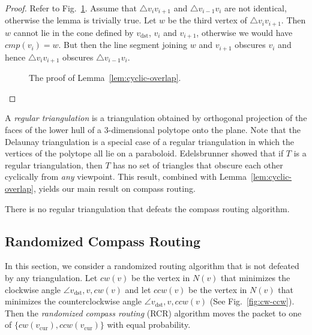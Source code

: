 \documentclass[final]{siamltex}
\newcommand{\centeripe}[1]{\begin{center}\Ipe{#1}\end{center}}
\newcommand{\seclabel}[1]{\label{sec:#1}}
\newcommand{\figlabel}[1]{\label{fig:#1}}
\newcommand{\figref}[1]{\mbox{Fig.~\ref{fig:#1}}}
\newcommand{\thmlabel}[1]{\label{thm:#1}}
\newcommand{\lemref}[1]{Lemma~\ref{lem:#1}}
\newcommand{\vdest}{v_\mathrm{dst}}
\newcommand{\vcur}{v_\mathrm{cur}}
\newcommand{\compass}[1]{\mathit{cmp}(#1)}
\newcommand{\cwcompass}[1]{\mathit{cw}(#1)}
\newcommand{\ccwcompass}[1]{\mathit{ccw}(#1)}
\newcommand{\neigb}[1]{\mathit{N(#1)}}
\begin{document}
\begin{proof}
Refer to \figref{overlap}.  Assume that $\triangle v_i v_{i+1}$ and
$\triangle v_{i-1} v_i$ are not identical, otherwise the lemma is
trivially true.  Let $w$ be the third vertex of $\triangle v_i
v_{i+1}$.  Then $w$ cannot lie in the cone defined by $\vdest$, $v_i$
and $v_{i+1}$, otherwise we would have $\compass{v_i}=w$.  But then
the line segment joining $w$ and $v_{i+1}$ obscures $v_i$ and hence
$\triangle v_i v_{i+1}$ obscures $\triangle v_{i-1} v_i$.
\begin{figure}
\centeripe{compass-obscure-proof}
\caption{The proof of \lemref{cyclic-overlap}.}
\figlabel{overlap}
\end{figure}
\qquad\end{proof}

A {\em regular triangulation\/} \cite{z94} is a triangulation obtained
by orthogonal projection of the faces of the lower hull of a
3-dimensional polytope onto the plane.  Note that the Delaunay
triangulation is a special case of a regular triangulation in which
the vertices of the polytope all lie on a paraboloid.  Edelsbrunner
\cite{e88} showed that if $T$ is a regular triangulation, then $T$ has
no set of triangles that obscure each other cyclically from {\em any\/}
viewpoint.  This result, combined with \lemref{cyclic-overlap},
yields our main result on compass routing.

\begin{theorem}\thmlabel{compass}
There is no regular triangulation that defeats the compass routing algorithm.
\end{theorem}

\subsection{Randomized Compass Routing}\seclabel{randomized}

In this section, we consider a randomized routing algorithm that is not
defeated by any triangulation.  Let $\cwcompass{v}$ be the vertex in
$\neigb{v}$ that minimizes the clockwise angle $\angle
\vdest,v,\cwcompass{v}$ and let $\ccwcompass{v}$ be the vertex in
$\neigb{v}$ that minimizes the counterclockwise angle $\angle
\vdest,v,\ccwcompass{v}$ 
(See \figref{cw-ccw}).  Then the {\em
randomized compass routing\/} (RCR) algorithm moves the packet to one of
$\{\cwcompass{\vcur},\ccwcompass{\vcur}\}$ with equal probability.
\end{document}
